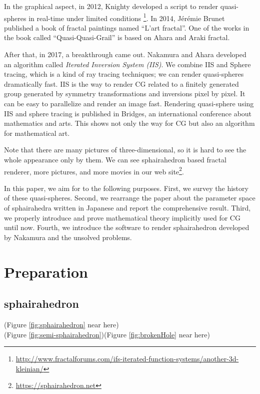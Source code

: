 \documentclass[suppldata, dvipdfmx]{interact}
\theoremstyle{plain}%
\theoremstyle{definition}
\theoremstyle{remark}
\theoremstyle{problemstyle}
\begin{document}
In the graphical aspect, in 2012, Knighty developed a script to render
quasi-spheres in real-time under limited conditions
\footnote{\url{http://www.fractalforums.com/ifs-iterated-function-systems/another-3d-kleinian/}}.
In 2014, J\'er\'emie Brunet published a book of
fractal paintings named ``L'art fractal''. One of the works in the book called
``Quasi-Quasi-Grail'' is based on Ahara and Araki fractal.

After that, in 2017, a breakthrough came out. 
Nakamura and Ahara developed an algorithm called
\textit{Iterated Inversion System (IIS)}\cite{bridges2016}\cite{bridges2017}.
We combine IIS and Sphere tracing, which is a kind of ray tracing
techniques; we can render quasi-spheres dramatically fast.
IIS is the way to render CG related to a finitely generated group
generated by symmetry transformations and inversions pixel by pixel.
It can be easy to parallelize and render an image fast. 
Rendering quasi-sphere using IIS and sphere tracing is published in
Bridges\cite{bridges2018}, an international conference about mathematics
and arts.
This shows not only the way for CG but also an algorithm for mathematical art.

Note that there are many pictures of three-dimensional, so it is hard to
see the whole appearance only by them. We can see sphairahedron based
fractal renderer, more pictures, and more movies in
our web site\footnote{\url{https://sphairahedron.net}}.

In this paper, we aim for to the following purposes.
First, we survey the history of these quasi-spheres.
Second, we rearrange the paper about the parameter space of sphairahedra
written in Japanese and report the comprehensive result.
Third, we properly introduce and prove mathematical theory implicitly
used for CG until now.
Fourth, we introduce the software to render sphairahedron developed by
Nakamura and the unsolved problems. 

\section{Preparation}

\subsection{sphairahedron}

\noindent(Figure \ref{fig:sphairahedron}
 near here)\\
\noindent(Figure \ref{fig:semi-sphairahedron})(Figure \ref{fig:brokenHole} near here)
\end{document}
